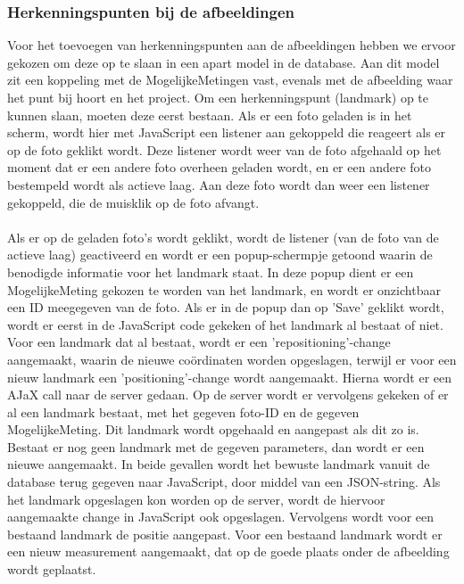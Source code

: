 \subsubsection{Herkenningspunten bij de afbeeldingen}
Voor het toevoegen van herkenningspunten aan de afbeeldingen hebben we ervoor gekozen om deze op te slaan in een apart model in de database.
Aan dit model zit een koppeling met de MogelijkeMetingen vast, evenals met de afbeelding waar het punt bij hoort en het project.
Om een herkenningspunt (landmark) op te kunnen slaan, moeten deze eerst bestaan.
Als er een foto geladen is in het scherm, wordt hier met JavaScript een listener aan gekoppeld die reageert als er op de foto geklikt wordt.
Deze listener wordt weer van de foto afgehaald op het moment dat er een andere foto overheen geladen wordt, en er een andere foto bestempeld wordt als actieve laag.
Aan deze foto wordt dan weer een listener gekoppeld, die de muisklik op de foto afvangt.
\\
\\
Als er op de geladen foto's wordt geklikt, wordt de listener (van de foto van de actieve laag) geactiveerd en wordt er een popup-schermpje getoond waarin de benodigde informatie voor het landmark staat.
In deze popup dient er een MogelijkeMeting gekozen te worden van het landmark, en wordt er onzichtbaar een ID meegegeven van de foto.
Als er in de popup dan op 'Save' geklikt wordt, wordt er eerst in de JavaScript code gekeken of het landmark al bestaat of niet.
Voor een landmark dat al bestaat, wordt er een 'repositioning'-change aangemaakt, waarin de nieuwe co\"{o}rdinaten worden opgeslagen, terwijl er voor een nieuw landmark een 'positioning'-change wordt aangemaakt.
Hierna wordt er een AJaX call naar de server gedaan.
Op de server wordt er vervolgens gekeken of er al een landmark bestaat, met het gegeven foto-ID en de gegeven MogelijkeMeting.
Dit landmark wordt opgehaald en aangepast als dit zo is.
Bestaat er nog geen landmark met de gegeven parameters, dan wordt er een nieuwe aangemaakt.
In beide gevallen wordt het bewuste landmark vanuit de database terug gegeven naar JavaScript, door middel van een JSON-string.
Als het landmark opgeslagen kon worden op de server, wordt de hiervoor aangemaakte change in JavaScript ook opgeslagen.
Vervolgens wordt voor een bestaand landmark de positie aangepast.
Voor een bestaand landmark wordt er een nieuw measurement aangemaakt, dat op de goede plaats onder de afbeelding wordt geplaatst.

